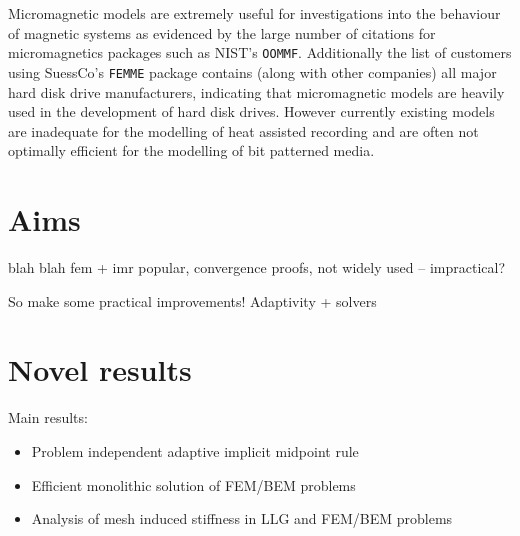 Micromagnetic models are extremely useful for investigations into the behaviour of magnetic systems as evidenced by the large number of citations for micromagnetics packages such as NIST's \texttt{OOMMF}\cite{oommf-website}. Additionally the list of customers using SuessCo's \texttt{FEMME} package\cite{suessco-website} contains (along with other companies) all major hard disk drive manufacturers, indicating that micromagnetic models are heavily used in the development of hard disk drives. However currently existing models are inadequate for the modelling of heat assisted recording and are often not optimally efficient for the modelling of bit patterned media.



\section{Aims}

blah blah fem + imr popular, convergence proofs, not widely used -- impractical?


So make some practical improvements! Adaptivity + solvers


\section{Novel results}

Main results:
\begin{itemize}
\item Problem independent adaptive implicit midpoint rule
\item Efficient monolithic solution of FEM/BEM problems
\item Analysis of mesh induced stiffness in LLG and FEM/BEM problems
\end{itemize}

